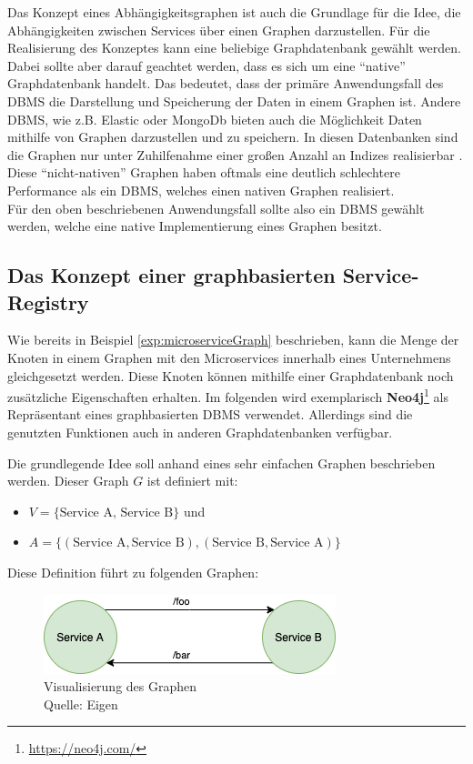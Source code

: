 \documentclass[
	12pt,
	BCOR=5mm,
	DIV=12,
	headinclude=on,
	footinclude=off,
	parskip=half,
	bibliography=totoc,
	listof=entryprefix,
	toc=listof,
	numbers=noenddot,
	plainfootsepline
]{scrreprt}
\begin{document}
Das Konzept eines Abhängigkeitsgraphen ist auch die Grundlage für die Idee, die Abhängigkeiten zwischen Services über einen Graphen darzustellen. Für die Realisierung des Konzeptes kann eine beliebige Graphdatenbank gewählt werden. Dabei sollte aber darauf geachtet werden, dass es sich um eine \enquote{native} Graphdatenbank handelt. Das bedeutet, dass der primäre Anwendungsfall des \ac{DBMS} die Darstellung und Speicherung der Daten in einem Graphen ist. Andere \ac{DBMS}, wie z.B. Elastic oder MongoDb bieten auch die Möglichkeit Daten mithilfe von Graphen darzustellen und zu speichern. In diesen Datenbanken sind die Graphen nur unter Zuhilfenahme einer großen Anzahl an Indizes realisierbar \autocite{JoyChao2016}. Diese \enquote{nicht-nativen} Graphen haben oftmals eine deutlich schlechtere Performance als ein \ac{DBMS}, welches einen nativen Graphen realisiert.\\
Für den oben beschriebenen Anwendungsfall sollte also ein \ac{DBMS} gewählt werden, welche eine native Implementierung eines Graphen besitzt.

\subsection{Das Konzept einer graphbasierten Service-Registry}

Wie bereits in Beispiel \vref{exp:microserviceGraph} beschrieben, kann die Menge der Knoten in einem Graphen mit den Microservices innerhalb eines Unternehmens gleichgesetzt werden. Diese Knoten können mithilfe einer Graphdatenbank noch zusätzliche Eigenschaften erhalten. Im folgenden wird exemplarisch \textbf{Neo4j}\footnote{\url{https://neo4j.com/}} als Repräsentant eines graphbasierten \ac{DBMS} verwendet. Allerdings sind die genutzten Funktionen auch in anderen Graphdatenbanken verfügbar.

Die grundlegende Idee soll anhand eines sehr einfachen Graphen beschrieben werden. Dieser Graph $G$ ist definiert mit:
\begin{itemize}
	\item $V = \{\text{Service A, Service B}\}$ und
	\item $A = \{(\text{Service A},\text{Service B}), (\text{Service B}, \text{Service A})\}$
\end{itemize}

Diese Definition führt zu folgenden Graphen:

\begin{figure}[h]
	\centering
	\includegraphics[width=0.65\linewidth]{img/service_dependencies.png}
	\caption[Abbildung eines simplen Abhängigkeitsgraphen]{Visualisierung des Graphen\\Quelle: Eigen}
\end{figure}
\end{document}
